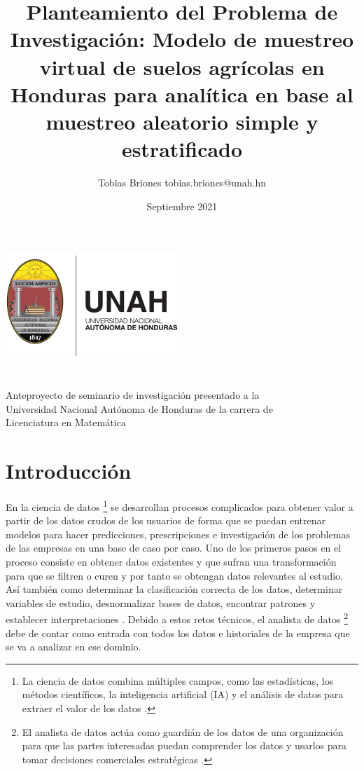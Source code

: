 \documentclass{report}
\title{Planteamiento del Problema de Investigación: Modelo de muestreo virtual de suelos agrícolas en Honduras para analítica en base al muestreo aleatorio simple y estratificado}
\author{Tobias Briones \bigbreak tobias.briones@unah.hn}
\date{Septiembre 2021}
\begin{document}
\makeatletter
    \begin{titlepage}
        \begin{center}
            \includegraphics[width=0.3\linewidth]{ref/logo-unah.png}\\[4ex]
            {\huge \bfseries \@title 
            \vspace{1cm}}\\[2ex]
            {\LARGE \@author}\\[50ex] 
            
            {\large
            Anteproyecto de seminario de investigación presentado a la\\
            Universidad Nacional Autónoma de Honduras de la carrera de\\
            Licenciatura en Matemática
            }\\[2ex]
            
            {\large \@date}
        \end{center}
    \end{titlepage}
\makeatother
\thispagestyle{empty}
\newpage

\thispagestyle{empty}
\tableofcontents
\newpage

\chapter{Introducción}

En la ciencia de datos \footnote{La ciencia de datos combina múltiples campos, como las estadísticas, los métodos científicos, la inteligencia artificial (IA) y el análisis de datos para extraer el valor de los datos \cite{oracle-data-science-2021}.} se desarrollan procesos complicados para obtener valor a partir de los datos crudos de los usuarios de forma que se puedan entrenar modelos para hacer predicciones, prescripciones e investigación de los problemas de las empresas en una base de caso por caso. Uno de los primeros pasos en el proceso consiste en obtener datos existentes y que sufran una transformación para que se filtren o curen y por tanto se obtengan datos relevantes al estudio. Así también como determinar la clasificación correcta de los datos, determinar variables de estudio, desnormalizar bases de datos, encontrar patrones y establecer  interpretaciones \cite{university-of-wisconsin-data-science-2021}. Debido a estos retos técnicos, el analista de datos \footnote{El analista de datos actúa como guardián de los datos de una organización para que las partes interesadas puedan comprender los datos y usarlos para tomar decisiones comerciales estratégicas \cite{eastwood-data-analyst-2021}.} debe de contar como entrada con todos los datos e historiales de la empresa que se va a analizar en ese dominio.
\end{document}
